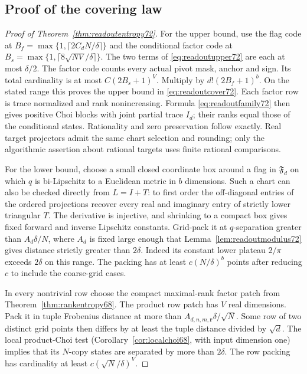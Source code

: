 \subsection{Proof of the covering law}
\begin{proof}[Proof of Theorem~\ref{thm:readoutentropy72}]
For the upper bound, use the flag code at
$B_f=\max\{1,\lceil2C_dN/\delta\rceil\}$ and the conditional factor
code at $B_s=\max\{1,\lceil8\sqrt{NV}/\delta\rceil\}$.
The two terms of \eqref{eq:readoutupper72} are each at most
$\delta/2$. The factor code counts every actual pivot mask, anchor
and sign. Its total cardinality is at most $C(2B_s+1)^V$.
Multiply by $d!(2B_f+1)^b$. On the stated range this proves the
upper bound in \eqref{eq:readoutcover72}. Each factor row is trace
normalized and rank nonincreasing. Formula \eqref{eq:readoutfamily72}
then gives positive Choi blocks with joint partial trace $I_d$;
their ranks equal those of the conditional states. Rationality and
zero preservation follow exactly. Real target projectors admit the
same chart selection and rounding; only the algorithmic assertion
about rational targets uses finite rational comparisons.

For the lower bound, choose a small closed coordinate box around a
flag in $\mathfrak F_d$ on which $q$ is bi-Lipschitz to a Euclidean
metric in $b$ dimensions. Such a chart can also be checked directly
from $L=I+T$: to first order the off-diagonal entries of the ordered
projections recover every real and imaginary entry of strictly lower
triangular $T$. The derivative is injective, and shrinking to a compact
box gives fixed forward and inverse Lipschitz constants. Grid-pack it
at $q$-separation greater than $A_d\delta/N$, where $A_d$ is fixed
large enough that Lemma~\ref{lem:readoutmodulus72} gives distance
strictly greater than $2\delta$. Indeed its constant lower plateau
$2/\pi$ exceeds $2\delta$ on this range. The packing has at least
$c(N/\delta)^b$ points after reducing $c$ to include the coarse-grid
cases.

In every nontrivial row choose the compact maximal-rank factor patch
from Theorem~\ref{thm:rankentropy68}. The product row patch has
$V$ real dimensions. Pack it in tuple Frobenius distance at more
than $A_{d,n,m,\boldsymbol r}\delta/\sqrt N$. Some row of two
distinct grid points then differs by at least the tuple distance
 divided by $\sqrt d$. The local product-Choi test
(Corollary~\ref{cor:localchoi68}, with input dimension one) implies
that its $N$-copy states are separated by more than $2\delta$.
The row packing has cardinality at least $c(\sqrt N/\delta)^V$.


\end{proof}
